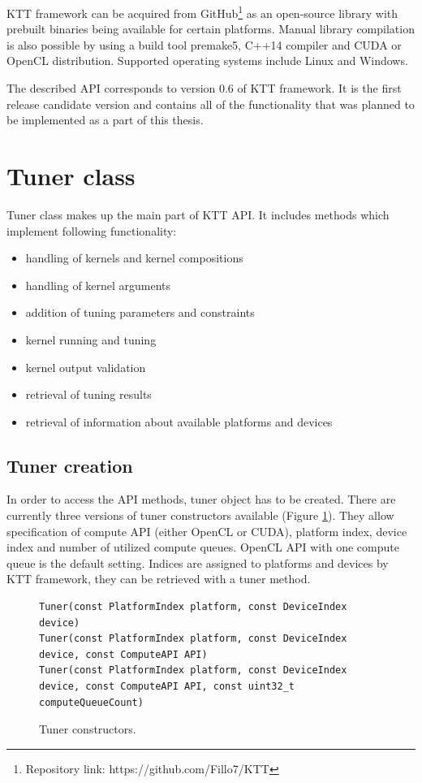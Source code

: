 \documentclass
[
    digital, %
    oneside, %
    table, %
    nolof, %
    nolot, %
    nocover %
]{fithesis3}
\begin{document}
KTT framework can be acquired from GitHub\footnote{Repository link: https://github.com/Fillo7/KTT} as an open-source library with prebuilt
binaries being available for certain platforms. Manual library compilation is also possible by using a build tool premake5, C++14 compiler and CUDA
or OpenCL distribution. Supported operating systems include Linux and Windows.

The described API corresponds to version 0.6 of KTT framework. It is the first release candidate version and contains all of the functionality that
was planned to be implemented as a part of this thesis.

\section{Tuner class}
Tuner class makes up the main part of KTT API. It includes methods which implement following functionality:
\begin{itemize}
    \item handling of kernels and kernel compositions
    \item handling of kernel arguments
    \item addition of tuning parameters and constraints
    \item kernel running and tuning
    \item kernel output validation
    \item retrieval of tuning results
    \item retrieval of information about available platforms and devices
\end{itemize}

\subsection{Tuner creation}
In order to access the API methods, tuner object has to be created. There are currently three versions of tuner constructors available (Figure 
\ref{ktt-constructors}). They allow specification of compute API (either OpenCL or CUDA), platform index, device index and number of utilized compute
queues. OpenCL API with one compute queue is the default setting. Indices are assigned to platforms and devices by KTT framework, they can be retrieved
with a tuner method.

\begin{figure}[ht]
\begin{adjustwidth}{-1cm}{-1cm}
\begin{lstlisting}
Tuner(const PlatformIndex platform, const DeviceIndex device)
Tuner(const PlatformIndex platform, const DeviceIndex device, const ComputeAPI API)
Tuner(const PlatformIndex platform, const DeviceIndex device, const ComputeAPI API, const uint32_t computeQueueCount)
\end{lstlisting}
\caption{Tuner constructors.}
\label{ktt-constructors}
\end{adjustwidth}
\end{figure}
\end{document}
